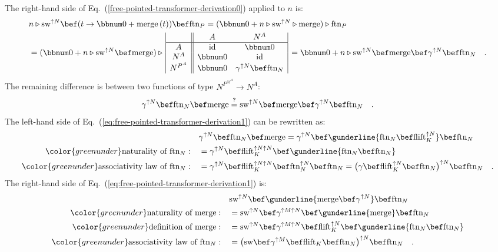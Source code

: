 The right-hand side of Eq.~(\ref{free-pointed-transformer-derivation0})
applied to $n$ is:
\begin{align*}
 & n\triangleright\text{sw}^{\uparrow N}\bef(t\rightarrow\bbnum 0+\text{merge}\,(t))\bef\text{ftn}_{P}=(\bbnum 0+n\triangleright\text{sw}^{\uparrow N}\triangleright\text{merge})\triangleright\text{ftn}_{P}\\
 & =(\bbnum 0+n\triangleright\text{sw}^{\uparrow N}\bef\text{merge})\triangleright\,\begin{array}{|c||cc|}
 & A & N^{A}\\
\hline A & \text{id} & \bbnum 0\\
N^{A} & \bbnum 0 & \text{id}\\
N^{P^{A}} & \bbnum 0 & \gamma^{\uparrow N}\bef\text{ftn}_{N}
\end{array}\,=\bbnum 0+n\triangleright\text{sw}^{\uparrow N}\bef\text{merge}\bef\gamma^{\uparrow N}\bef\text{ftn}_{N}\quad.
\end{align*}
The remaining difference is between two functions of type $N^{P^{M^{A}}}\rightarrow N^{A}$:
\begin{equation}
\gamma^{\uparrow N}\bef\text{ftn}_{N}\bef\text{merge}\overset{?}{=}\text{sw}^{\uparrow N}\bef\text{merge}\bef\gamma^{\uparrow N}\bef\text{ftn}_{N}\quad.\label{eq:free-pointed-transformer-derivation1}
\end{equation}
The left-hand side of Eq.~(\ref{eq:free-pointed-transformer-derivation1})
can be rewritten as:
\begin{align*}
 & \gamma^{\uparrow N}\bef\text{ftn}_{N}\bef\text{merge}=\gamma^{\uparrow N}\bef\gunderline{\text{ftn}_{N}\bef\text{flift}_{K}^{\uparrow N}}\bef\text{ftn}_{N}\\
{\color{greenunder}\text{naturality of }\text{ftn}_{N}:}\quad & =\gamma^{\uparrow N}\bef\text{flift}_{K}^{\uparrow N\uparrow N}\bef\gunderline{\text{ftn}_{N}\bef\text{ftn}_{N}}\\
{\color{greenunder}\text{associativity law of }\text{ftn}_{N}:}\quad & =\gamma^{\uparrow N}\bef\text{flift}_{K}^{\uparrow N\uparrow N}\bef\text{ftn}_{N}^{\uparrow N}\bef\text{ftn}_{N}=\big(\gamma\bef\text{flift}_{K}^{\uparrow N}\bef\text{ftn}_{N}\big)^{\uparrow N}\bef\text{ftn}_{N}\quad.
\end{align*}
The right-hand side of Eq.~(\ref{eq:free-pointed-transformer-derivation1})
is:
\begin{align*}
 & \text{sw}^{\uparrow N}\bef\gunderline{\text{merge}\bef\gamma^{\uparrow N}}\bef\text{ftn}_{N}\\
{\color{greenunder}\text{naturality of }\text{merge}:}\quad & =\text{sw}^{\uparrow N}\bef\gamma^{\uparrow M\uparrow N}\bef\gunderline{\text{merge}}\bef\text{ftn}_{N}\\
{\color{greenunder}\text{definition of }\text{merge}:}\quad & =\text{sw}^{\uparrow N}\bef\gamma^{\uparrow M\uparrow N}\bef\text{flift}_{K}^{\uparrow N}\bef\gunderline{\text{ftn}_{N}\bef\text{ftn}_{N}}\\
{\color{greenunder}\text{associativity law of }\text{ftn}_{N}:}\quad & =\big(\text{sw}\bef\gamma^{\uparrow M}\bef\text{flift}_{K}\bef\text{ftn}_{N}\big)^{\uparrow N}\bef\text{ftn}_{N}\quad.
\end{align*}
